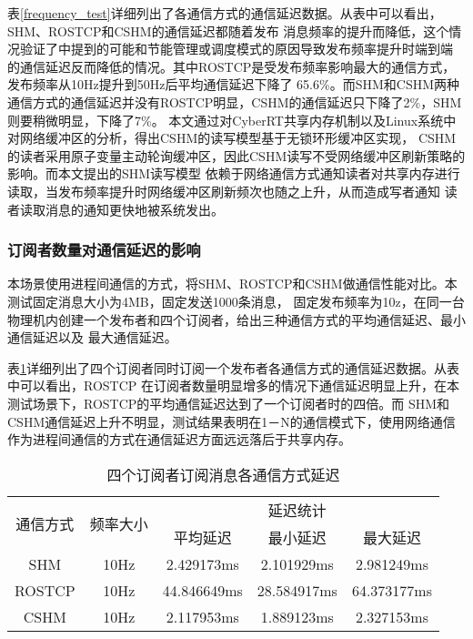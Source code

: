 表\ref{frequency_test}详细列出了各通信方式的通信延迟数据。从表中可以看出，SHM、ROSTCP和CSHM的通信延迟都随着发布
消息频率的提升而降低，这个情况验证了\cite{9591166}中提到的可能和节能管理或调度模式的原因导致发布频率提升时端到端
的通信延迟反而降低的情况。其中ROSTCP是受发布频率影响最大的通信方式，发布频率从10Hz提升到50Hz后平均通信延迟下降了
65.6\%。而SHM和CSHM两种通信方式的通信延迟并没有ROSTCP明显，CSHM的通信延迟只下降了2\%，SHM则要稍微明显，下降了7\%。
本文通过对CyberRT共享内存机制以及Linux系统中对网络缓冲区的分析，得出CSHM的读写模型基于无锁环形缓冲区实现，
CSHM的读者采用原子变量主动轮询缓冲区，因此CSHM读写不受网络缓冲区刷新策略的影响。而本文提出的SHM读写模型
依赖于网络通信方式通知读者对共享内存进行读取，当发布频率提升时网络缓冲区刷新频次也随之上升，从而造成写者通知
读者读取消息的通知更快地被系统发出。

\subsubsection{订阅者数量对通信延迟的影响}
本场景使用进程间通信的方式，将SHM、ROSTCP和CSHM做通信性能对比。本测试固定消息大小为4MB，固定发送1000条消息，
固定发布频率为10z，在同一台物理机内创建一个发布者和四个订阅者，给出三种通信方式的平均通信延迟、最小通信延迟以及
最大通信延迟。

表\ref{multi_subscribers}详细列出了四个订阅者同时订阅一个发布者各通信方式的通信延迟数据。从表中可以看出，ROSTCP
在订阅者数量明显增多的情况下通信延迟明显上升，在本测试场景下，ROSTCP的平均通信延迟达到了一个订阅者时的四倍。而
SHM和CSHM通信延迟上升不明显，测试结果表明在1－N的通信模式下，使用网络通信作为进程间通信的方式在通信延迟方面远远落后于共享内存。
\begin{table}[htb]
  \centering\small
  \caption{四个订阅者订阅消息各通信方式延迟}
  \renewcommand\arraystretch{1.2}
  \label{multi_subscribers}
  \begin{tabular}{ccccc}
    \toprule
    \multirow{2}{*}{通信方式} & \multirow{2}{*}{频率大小} & \multicolumn{3}{c}{延迟统计}\\
     & & 平均延迟 & 最小延迟 & 最大延迟\\
    \midrule
    SHM & 10Hz & 2.429173ms & 2.101929ms & 2.981249ms\\ 
    \hline
    ROSTCP & 10Hz & 44.846649ms & 28.584917ms & 64.373177ms\\ 
    \hline
    CSHM & 10Hz & 2.117953ms & 1.889123ms & 2.327153ms\\ 
    \bottomrule
  \end{tabular}
\end{table}


